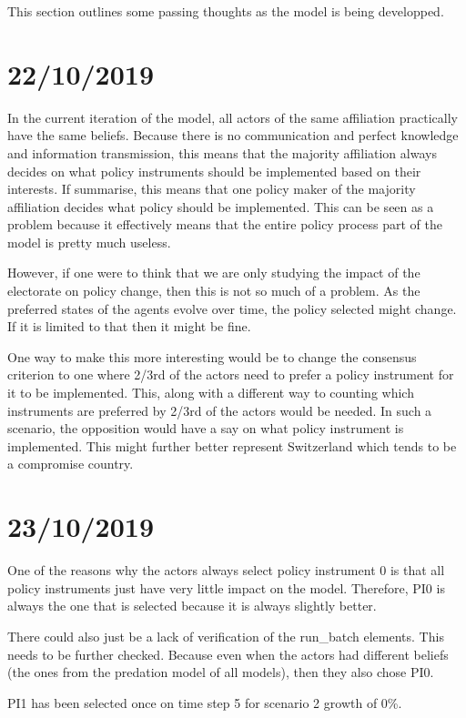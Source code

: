 This section outlines some passing thoughts as the model is being developped.

\section{22/10/2019}

In the current iteration of the model, all actors of the same affiliation practically have the same beliefs. Because there is no communication and perfect knowledge and information transmission, this means that the majority affiliation always decides on what policy instruments should be implemented based on their interests. If summarise, this means that one policy maker of the majority affiliation decides what policy should be implemented. This can be seen as a problem because it effectively means that the entire policy process part of the model is pretty much useless.

However, if one were to think that we are only studying the impact of the electorate on policy change, then this is not so much of a problem. As the preferred states of the agents evolve over time, the policy selected might change. If it is limited to that then it might be fine.

One way to make this more interesting would be to change the consensus criterion to one where 2/3rd of the actors need to prefer a policy instrument for it to be implemented. This, along with a different way to counting which instruments are preferred by 2/3rd of the actors would be needed. In such a scenario, the opposition would have a say on what policy instrument is implemented. This might further better represent Switzerland which tends to be a compromise country.

\section{23/10/2019}

One of the reasons why the actors always select policy instrument 0 is that all policy instruments just have very little impact on the model. Therefore, PI0 is always the one that is selected because it is always slightly better.

There could also just be a lack of verification of the run\_batch elements. This needs to be further checked. Because even when the actors had different beliefs (the ones from the predation model of all models), then they also chose PI0.

PI1 has been selected once on time step 5 for scenario 2 growth of 0\%.

